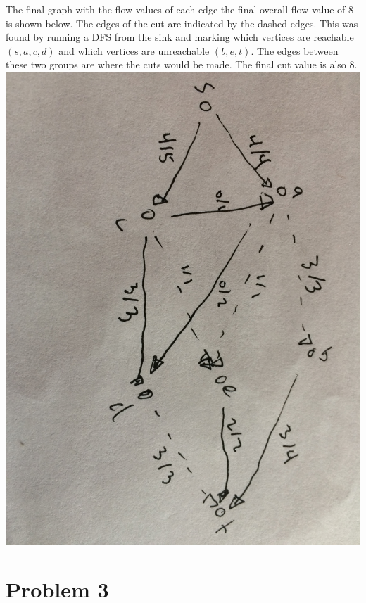 \documentclass[11pt]{article}
\begin{document}
The final graph with the flow values of each edge the final overall flow value of 8 is shown below. The edges of the cut are indicated by the dashed edges. This was found by running a DFS from the sink and marking which vertices are reachable $(s,a,c,d)$ and which vertices are unreachable $(b,e,t)$. The edges between these two groups are where the cuts would be made. The final cut value is also 8.\\
\includegraphics[scale=.1]{IMG_5556.jpg} \\
\section*{Problem 3}
\end{document}
